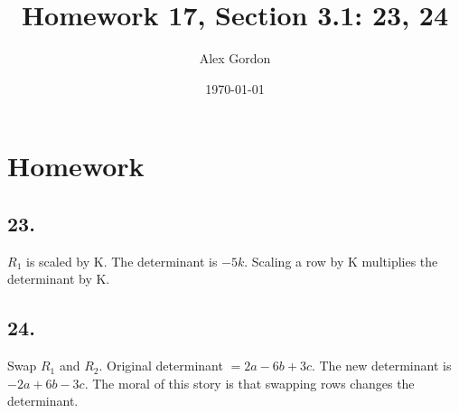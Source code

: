 \documentclass[12]{scrartcl}
\begin{document}
\title{Homework 17, Section 3.1: 23, 24}
\author{Alex Gordon}
\date{\today}
\maketitle
\section*{Homework}
\subsection*{23.}
$R_1$ is scaled by K. The determinant is $-5k$. Scaling a row by K multiplies the determinant by K. 
\subsection*{24.}
Swap $R_1$ and $R_2$. Original determinant $= 2a - 6b + 3c$. The new determinant is $-2a + 6b -3c$. The moral of this story is that swapping rows changes the determinant. 
\end{document}
